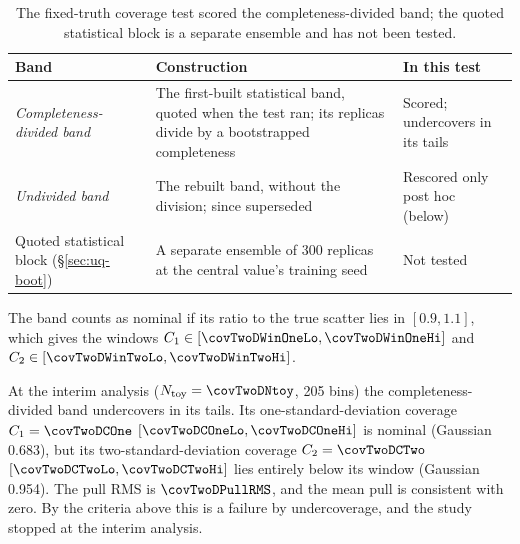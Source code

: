 \begin{table}[htbp]
  \caption[The three 2D statistical bands]{The fixed-truth coverage test scored the completeness-divided band; the quoted statistical block is a separate ensemble and has not been tested.}
  \label{tab:coverage-bands}
  \centering\small
  \begin{tabular}{@{}p{}p{}p{}@{}}
    \toprule
    Band & Construction & In this test \\
    \midrule
    \emph{Completeness-divided band} & The first-built statistical band, quoted when the test ran; its replicas divide by a bootstrapped completeness & Scored; undercovers in its tails \\
    \addlinespace
    \emph{Undivided band} & The rebuilt band, without the division; since superseded & Rescored only post hoc (below) \\
    \addlinespace
    Quoted statistical block (\S\ref{sec:uq-boot}) & A separate ensemble of 300 replicas at the central value's training seed & Not tested \\
    \bottomrule
  \end{tabular}
\end{table}



The band counts as nominal if its ratio to the true scatter lies in $[0.9,1.1]$, which gives the windows $C_1\in[\covTwoDWinOneLo,\covTwoDWinOneHi]$ and $C_2\in[\covTwoDWinTwoLo,\covTwoDWinTwoHi]$.

At the interim analysis ($N_{\text{toy}}=\covTwoDNtoy$, 205 bins) the completeness-divided band undercovers in its tails. Its one-standard-deviation coverage $C_1=\covTwoDCOne$ $[\covTwoDCOneLo,\covTwoDCOneHi]$ is nominal (Gaussian 0.683), but its two-standard-deviation coverage $C_2=\covTwoDCTwo$ $[\covTwoDCTwoLo,\covTwoDCTwoHi]$ lies entirely below its window (Gaussian 0.954). The pull RMS is $\covTwoDPullRMS$, and the mean pull is consistent with zero. By the criteria above this is a failure by undercoverage, and the study stopped at the interim analysis.

